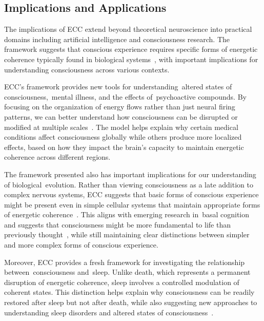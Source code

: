 \subsection*{Implications and Applications}

The implications of ECC extend beyond theoretical neuroscience into practical domains including artificial intelligence and consciousness research. The framework suggests that conscious experience requires specific forms of energetic coherence typically found in biological systems~\cite{thompson2010mind}, with important implications for understanding consciousness across various contexts.

ECC's framework provides new tools for understanding~altered states of consciousness,~mental illness, and the effects of~psychoactive compounds. By focusing on the organization of energy flows rather than just neural firing patterns, we can better understand how consciousness can be disrupted or modified at multiple scales~\cite{varela1991embodied}. The model helps explain why certain medical conditions affect consciousness globally while others produce more localized effects, based on how they impact the brain's capacity to maintain energetic coherence across different regions.

The framework presented also has important implications for our understanding of biological~evolution. Rather than viewing consciousness as a late addition to complex nervous systems, ECC suggests that basic forms of conscious experience might be present even in simple cellular systems that maintain appropriate forms of energetic coherence~\cite{margulis2001conscious}. This aligns with emerging research in~basal cognition and suggests that consciousness might be more fundamental to life than previously thought~\cite{levin2019computational,Lyon2021}, while still maintaining clear distinctions between simpler and more complex forms of conscious experience.

Moreover, ECC provides a fresh framework for investigating the relationship between~consciousness and~sleep. Unlike death, which represents a permanent disruption of energetic coherence, sleep involves a controlled modulation of coherent states. This distinction helps explain why consciousness can be readily restored after sleep but not after death, while also suggesting new approaches to understanding sleep disorders and altered states of consciousness~\cite{Dittrich2010,carhart2014entropic}.

